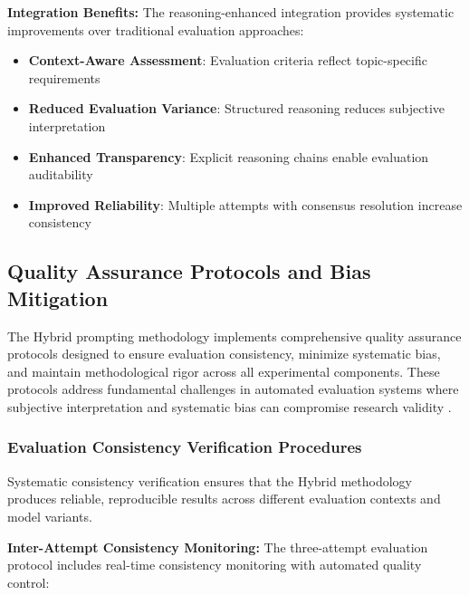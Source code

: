 \textbf{Integration Benefits:}
The reasoning-enhanced integration provides systematic improvements over traditional evaluation approaches:

\begin{itemize}
    \item \textbf{Context-Aware Assessment}: Evaluation criteria reflect topic-specific requirements
    \item \textbf{Reduced Evaluation Variance}: Structured reasoning reduces subjective interpretation
    \item \textbf{Enhanced Transparency}: Explicit reasoning chains enable evaluation auditability
    \item \textbf{Improved Reliability}: Multiple attempts with consensus resolution increase consistency
\end{itemize}

\subsection{Quality Assurance Protocols and Bias Mitigation}
\label{subsec:quality-assurance-bias-mitigation}

The Hybrid prompting methodology implements comprehensive quality assurance protocols designed to ensure evaluation consistency, minimize systematic bias, and maintain methodological rigor across all experimental components. These protocols address fundamental challenges in automated evaluation systems where subjective interpretation and systematic bias can compromise research validity \cite{lee2025reasoning_evaluation_survey}.

\subsubsection{Evaluation Consistency Verification Procedures}

Systematic consistency verification ensures that the Hybrid methodology produces reliable, reproducible results across different evaluation contexts and model variants.

\textbf{Inter-Attempt Consistency Monitoring:}
The three-attempt evaluation protocol includes real-time consistency monitoring with automated quality control:

